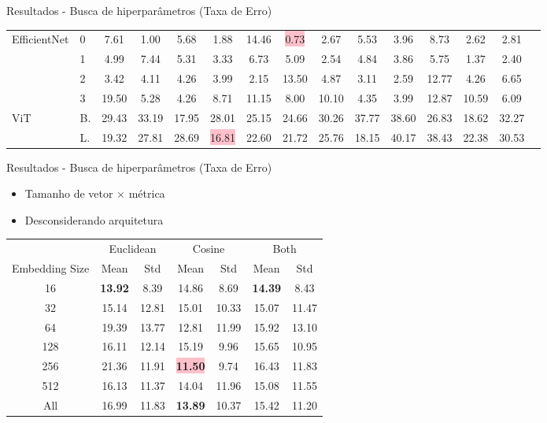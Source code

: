 \begin{frame}{Resultados - Busca de hiperparâmetros (Taxa de Erro)}
\begin{table}
\begin{tabular}{llcccccc|ccccccc}
\midrule
\multirow{4}{*}{EfficientNet} & 0  & 7.61 & 1.00 & 5.68 & 1.88 & 14.46 & \colorbox{pink}{0.73} & 2.67 & 5.53 & 3.96 & 8.73 & 2.62 & 2.81 \\
                              & 1  & 4.99 & 7.44 & 5.31 & 3.33 & 6.73 & 5.09 & 2.54 & 4.84 & 3.86 & 5.75 & 1.37 & 2.40 \\
                              & 2  & 3.42 & 4.11 & 4.26 & 3.99 & 2.15 & 13.50 & 4.87 & 3.11 & 2.59 & 12.77 & 4.26 & 6.65 \\
                              & 3  & 19.50 & 5.28 & 4.26 & 8.71 & 11.15 & 8.00 & 10.10 & 4.35 & 3.99 & 12.87 & 10.59 & 6.09 \\
\midrule
\multirow{2}{*}{ViT}    & B.  & 29.43 & 33.19 & 17.95 & 28.01 & 25.15 & 24.66 & 30.26 & 37.77 & 38.60 & 26.83 & 18.62 & 32.27 \\
                        & L. & 19.32 & 27.81 & 28.69 & \colorbox{pink}{16.81} & 22.60 & 21.72 & 25.76 & 18.15 & 40.17 & 38.43 & 22.38 & 30.53 \\
\bottomrule
\end{tabular}
\end{table}
\end{frame}

\begin{frame}{Resultados - Busca de hiperparâmetros (Taxa de Erro)}
    \begin{itemize}
        \item Tamanho de vetor $\times$ métrica
        \item Desconsiderando arquitetura
    \end{itemize}
\begin{table}
    \centering
\begin{tabular}{ccc|cc|cc}
& \multicolumn{2}{c}{Euclidean} & \multicolumn{2}{c}{Cosine} & \multicolumn{2}{c}{Both} \\
\cmidrule(lr){2-3} \cmidrule(lr){4-5} \cmidrule(lr){6-7}
Embedding Size & Mean & Std & Mean & Std & Mean & Std \\
\midrule
16  & \textbf{13.92} & 8.39 & 14.86 & 8.69 & \textbf{14.39} & 8.43 \\
32  & 15.14 & 12.81 & 15.01 & 10.33 & 15.07 & 11.47 \\
64  & 19.39 & 13.77 & 12.81 & 11.99 & 15.92 & 13.10 \\
128 & 16.11 & 12.14 & 15.19 & 9.96 & 15.65 & 10.95 \\
256 & 21.36 & 11.91 & \colorbox{pink}{\textbf{11.50}} & 9.74 & 16.43 & 11.83 \\
512 & 16.13 & 11.37 & 14.04 & 11.96 & 15.08 & 11.55 \\
\midrule
All & 16.99 & 11.83 & \textbf{13.89} & 10.37 & 15.42 & 11.20 \\
\bottomrule
\end{tabular}
\end{table}
\end{frame}


